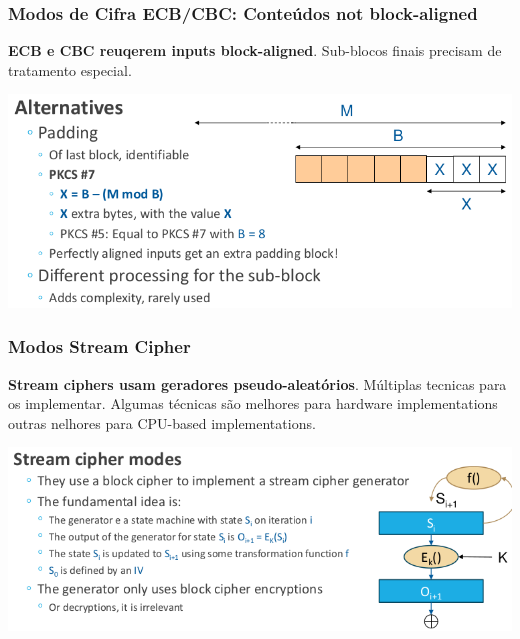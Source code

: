 \documentclass{article}
\begin{document}
\subsubsection{Modos de Cifra ECB/CBC: Conteúdos not block-aligned}

\begin{flushleft}
  \textbf{ECB e CBC reuqerem inputs block-aligned}. Sub-blocos finais precisam de
  tratamento especial.

  \begin{center}
    \includegraphics[scale=0.3]{85}
  \end{center}
\end{flushleft}

\pagebreak

\subsubsection{Modos Stream Cipher}

\begin{flushleft}
  \textbf{Stream ciphers usam geradores pseudo-aleatórios}. Múltiplas tecnicas para
  os implementar. Algumas técnicas são melhores para hardware implementations
  outras nelhores para CPU-based implementations.

  \begin{center}
    \includegraphics[scale=0.3]{86}
  \end{center}
\end{flushleft}
\end{document}
